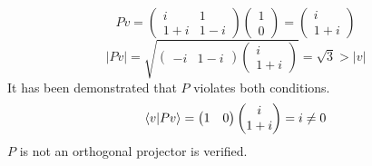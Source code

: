 \begin{sol}
\begin{enumerate}[label=\textbf{(\alph*)}]
$$Pv=\begin{pmatrix}i&1\\1+i&1-i\end{pmatrix}\begin{pmatrix}1\\0\end{pmatrix}=\begin{pmatrix}i\\1+i\end{pmatrix}$$ 
$$|Pv|=\sqrt{\begin{pmatrix}-i&1-i\end{pmatrix}\begin{pmatrix}i\\1+i\end{pmatrix}}=\sqrt 3>|v|$$ 
It has been demonstrated that $P$ violates both conditions.
$$\braket{v}{Pv}=\begin{pmatrix}1&0\end{pmatrix}\begin{pmatrix}i\\1+i\end{pmatrix}=i\neq 0$$ 
$P$ is not an orthogonal projector is verified. 

\end{enumerate}
\end{sol}
